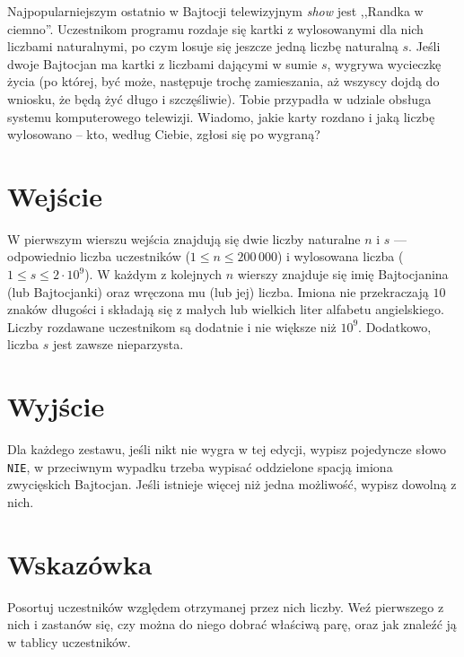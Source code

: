 \documentclass{spiral-kurs}
\begin{document}
\makeheader
%
    Najpopularniejszym ostatnio w Bajtocji telewizyjnym \textit{show} jest ,,Randka w ciemno''. Uczestnikom programu rozdaje się kartki z wylosowanymi dla nich liczbami naturalnymi, po czym losuje się jeszcze jedną liczbę naturalną $s$. 
    Jeśli dwoje Bajtocjan ma kartki z liczbami dającymi w sumie $s$, 
    wygrywa wycieczkę życia (po której, być może, następuje trochę zamieszania, aż wszyscy dojdą do wniosku, że będą żyć długo i szczęśliwie).
    Tobie przypadła w udziale obsługa systemu komputerowego telewizji. Wiadomo, jakie karty rozdano i jaką liczbę wylosowano -- kto, według Ciebie, zgłosi się po wygraną?
  
    \section{Wejście}
    W pierwszym wierszu wejścia znajdują się dwie liczby naturalne $n$ i $s$ --- odpowiednio liczba uczestników ($1 \leq n \leq 200\,000$) i wylosowana liczba ($1 \leq s \leq 2\cdot 10^9$). 
    W każdym z kolejnych $n$ wierszy znajduje się imię Bajtocjanina (lub Bajtocjanki) oraz wręczona mu (lub jej) liczba. Imiona nie przekraczają $10$ znaków długości i składają się z małych lub wielkich liter alfabetu angielskiego. 
    Liczby rozdawane uczestnikom są dodatnie i nie większe niż $10^9$. Dodatkowo, liczba $s$ jest zawsze nieparzysta.
    \section{Wyjście}
    Dla każdego zestawu, jeśli nikt nie wygra w tej edycji, wypisz pojedyncze słowo \texttt{NIE}, w przeciwnym wypadku trzeba wypisać oddzielone spacją imiona zwycięskich Bajtocjan. Jeśli istnieje więcej niż jedna możliwość, wypisz dowolną z nich.
    \section{Wskazówka}
    Posortuj uczestników względem otrzymanej przez nich liczby. Weź pierwszego z nich i zastanów się, czy można do niego dobrać właściwą parę, oraz jak znaleźć ją w tablicy uczestników.
    
  
\end{document}
